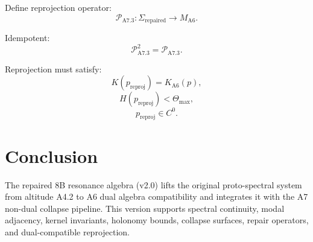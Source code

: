 \documentclass[11pt]{article}
\begin{document}
Define reprojection operator:
\[
\mathcal{P}_{\mathrm{A7.3}} :
\Sigma_{\mathrm{repaired}} \to M_{\mathrm{A6}}.
\]

Idempotent:
\[
\mathcal{P}_{\mathrm{A7.3}}^2 = \mathcal{P}_{\mathrm{A7.3}}.
\]

Reprojection must satisfy:
\[
K(p_{\mathrm{reproj}}) = K_{\mathrm{A6}}(p),
\]
\[
H(p_{\mathrm{reproj}}) < \Theta_{\max},
\]
\[
p_{\mathrm{reproj}} \in C^0.
\]

\section{Conclusion}

The repaired 8B resonance algebra (v2.0) lifts the original proto-spectral
system from altitude A4.2 to A6 dual algebra compatibility and integrates
it with the A7 non-dual collapse pipeline. This version supports spectral
continuity, modal adjacency, kernel invariants, holonomy bounds, collapse
surfaces, repair operators, and dual-compatible reprojection.
\end{document}
